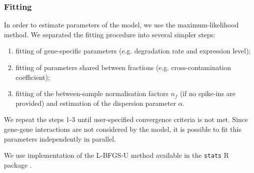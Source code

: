 \subsubsection{Fitting}
In order to estimate parameters of the model, we use the maximum-likelihood method.
We separated the fitting procedure into several simpler steps:
\begin{enumerate}
 \item fitting of gene-specific parameters (e.g. degradation rate and expression level);
 \item fitting of parameters shared between fractions (e.g. cross-contamination coefficient); 
 \item fitting of the between-sample normalisation factors $n_f$
 (if no spike-ins are provided) and estimation of the dispersion parameter $\alpha$.
\end{enumerate}
We repeat the steps 1-3 until
user-specified convergence criteria is not met.
 Since gene-gene interactions are not considered by the model, it is possible to 
 fit this parameters independently in parallel. 

We use implementation of the {L-BFGS-U} method \citep{byrd1995limited}
available in the \verb|stats| R package \citep{rlang}.

